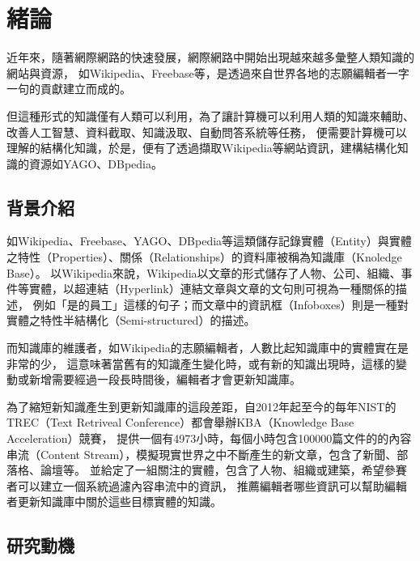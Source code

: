 \chapter{緒論}
\label{c:intro}

近年來，隨著網際網路的快速發展，網際網路中開始出現越來越多彙整人類知識的網站與資源，
如Wikipedia、Freebase等，是透過來自世界各地的志願編輯者一字一句的貢獻建立而成的。

但這種形式的知識僅有人類可以利用，為了讓計算機可以利用人類的知識來輔助、改善人工智慧、資料截取、知識汲取、自動問答系統等任務，
便需要計算機可以理解的結構化知識，於是，便有了透過擷取Wikipedia等網站資訊，建構結構化知識的資源如YAGO、DBpedia。



\section{背景介紹}
如Wikipedia、Freebase、YAGO、DBpedia等這類儲存記錄實體（Entity）與實體之特性（Properties）、關係（Relationships）的資料庫被稱為知識庫（Knoledge Base）。
以Wikipedia來說，Wikipedia以文章的形式儲存了人物、公司、組織、事件等實體，以超連結（Hyperlink）連結文章與文章的文句則可視為一種關係的描述，
例如「是的員工」這樣的句子；而文章中的資訊框（Infoboxes）則是一種對實體之特性半結構化（Semi-structured）的描述。    

而知識庫的維護者，如Wikipedia的志願編輯者，人數比起知識庫中的實體實在是非常的少，
這意味著當舊有的知識產生變化時，或有新的知識出現時，這樣的變動或新增需要經過一段長時間後，編輯者才會更新知識庫。\cite{Nakashole:2012:PATTY}

為了縮短新知識產生到更新知識庫的這段差距，自2012年起至今的每年NIST的TREC（Text Retriveal Conference）都會舉辦KBA（Knowledge Base Acceleration）競賽，
提供一個有4973小時，每個小時包含100000篇文件的的內容串流（Content Stream），模擬現實世界之中不斷產生的新文章，包含了新聞、部落格、論壇等。
並給定了一組關注的實體，包含了人物、組織或建築，希望參賽者可以建立一個系統過濾內容串流中的資訊，
推薦編輯者哪些資訊可以幫助編輯者更新知識庫中關於這些目標實體的知識。


\section{研究動機}





